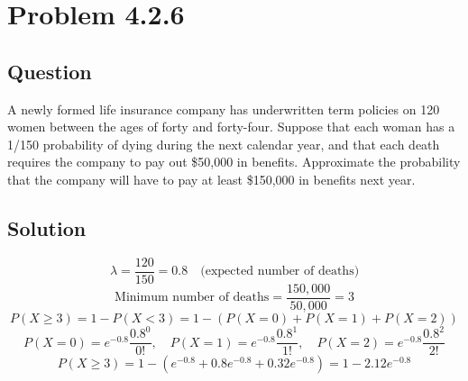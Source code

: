 \documentclass[12pt]{article}
\begin{document}
\section*{Problem 4.2.6}
\subsection*{Question}
A newly formed life insurance company has underwritten term policies on 120 women between the ages of forty and forty-four. Suppose that each woman has a 1/150 probability of dying during the next calendar year, and that each death requires the company to pay out \$50,000 in benefits. Approximate the probability that the company will have to pay at least \$150,000 in benefits next year.

\subsection*{Solution}
\[
\lambda = \frac{120}{150} = 0.8 \quad \text{(expected number of deaths)}
\]
\[
\text{Minimum number of deaths} = \frac{150,000}{50,000} = 3
\]
\[
P(X \geq 3) = 1 - P(X < 3) = 1 - (P(X=0) + P(X=1) + P(X=2))
\]
\[
P(X = 0) = e^{-0.8} \frac{0.8^0}{0!}, \quad P(X = 1) = e^{-0.8} \frac{0.8^1}{1!}, \quad P(X = 2) = e^{-0.8} \frac{0.8^2}{2!}
\]
\[
P(X \geq 3) = 1 - (e^{-0.8} + 0.8 e^{-0.8} + 0.32 e^{-0.8}) = 1 - 2.12 e^{-0.8}
\]
\end{document}
